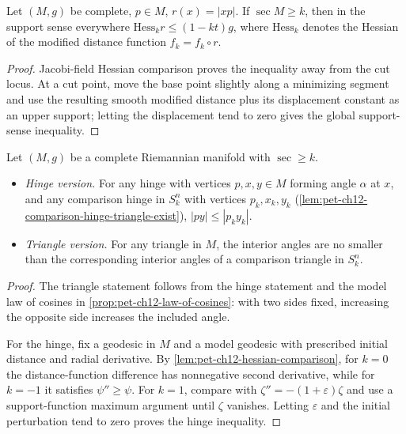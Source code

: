 \begin{lemma}
  \label{lem:pet-ch12-hessian-comparison}
  Let $(M,g)$ be complete, $p\in M$, $r(x)=|xp|$. If $\sec M\ge k$, then in the
  support sense everywhere $\mathrm{Hess}_kr\le(1-kt)g$, where $\mathrm{Hess}_k$
  denotes the Hessian of the modified distance function $f_k=f_k\circ r$.
\end{lemma}
\begin{proof}
  \sketch
  Jacobi-field Hessian comparison proves the inequality away from the cut
  locus. At a cut point, move the base point slightly along a minimizing
  segment and use the resulting smooth modified distance plus its displacement
  constant as an upper support; letting the displacement tend to zero gives
  the global support-sense inequality.
\end{proof}

\begin{theorem}
  \label{thm:pet-ch12-toponogov}
  Let $(M,g)$ be a complete Riemannian manifold with $\sec\ge k$.
  \begin{itemize}
    \item \emph{Hinge version.} For any hinge with vertices $p,x,y\in M$ forming
      angle $\alpha$ at $x$, and any comparison hinge in $S_k^n$ with vertices
      $p_k,x_k,y_k$ (\cref{lem:pet-ch12-comparison-hinge-triangle-exist}),
      $|py|\le|p_ky_k|$.
    \item \emph{Triangle version.} For any triangle in $M$, the interior angles
      are no smaller than the corresponding interior angles of a comparison
      triangle in $S_k^n$.
  \end{itemize}
\end{theorem}
\begin{proof}
  \sketch
  The triangle statement follows from the hinge statement and the model law of
  cosines in \cref{prop:pet-ch12-law-of-cosines}: with two sides fixed,
  increasing the opposite side increases the
  included angle.

  For the hinge, fix a geodesic in $M$ and a model geodesic with prescribed
  initial distance and radial derivative. By
  \cref{lem:pet-ch12-hessian-comparison}, for
  $k=0$ the distance-function difference has nonnegative second derivative,
  while for $k=-1$ it satisfies $\psi''\ge\psi$. For $k=1$, compare with
  $\zeta''=-(1+\varepsilon)\zeta$ and use a support-function maximum argument
  until $\zeta$ vanishes. Letting $\varepsilon$ and the initial perturbation
  tend to zero proves the hinge inequality.
\end{proof}

